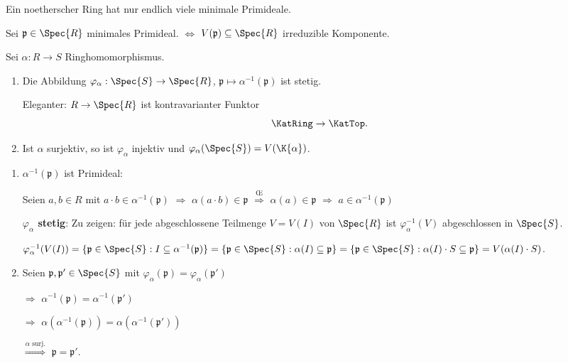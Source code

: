 \begin{Folg}
Ein noetherscher Ring hat nur endlich viele minimale Primideale.

\begin{Bew}
Sei $\mathfrak{p} \in \Spec{R}$ minimales Primideal. $\Leftrightarrow$ $V(\mathfrak{p}) \subseteq \Spec{R}$ irreduzible Komponente.
\end{Bew}
\end{Folg}

\begin{Prop}
Sei $\alpha : R \rightarrow S$ Ringhomomorphismus.

\begin{enumerate}
\item Die Abbildung $\varphi_\alpha : \Spec{S} \rightarrow \Spec{R}$, $\mathfrak{p} \mapsto \alpha^{-1}(\mathfrak{p})$ ist stetig.

Eleganter: $R \rightarrow \Spec{R}$ ist kontravarianter Funktor
\[
\KatRing \to \KatTop.
\]

\item Ist $\alpha$ surjektiv, so ist $\varphi_\alpha$ injektiv und $\varphi_\alpha(\Spec{S}) = V(\K{\alpha})$.
\end{enumerate}

\begin{Bew}
\begin{enumerate}
\item $\alpha^{-1}(\mathfrak{p})$ ist Primideal:

Seien $a,b \in R$ mit $a \cdot b \in \alpha^{-1}(\mathfrak{p})$ $\Rightarrow$ $\alpha(a \cdot b) \in \mathfrak{p}$ $\overset{\text{\OE}}\Rightarrow$ $\alpha(a) \in \mathfrak{p}$ $\Rightarrow$ $a \in \alpha^{-1}(\mathfrak{p})$

\textbf{$\varphi_\alpha$ stetig}: Zu zeigen: f\"ur jede abgeschlossene Teilmenge $V = V(I)$ von $\Spec{R}$ ist $\varphi_\alpha^{-1}(V)$ abgeschlossen in $\Spec{S}$.

$\varphi_\alpha^{-1}(V(I)) = \{ \mathfrak{p} \in \Spec{S} : I \subseteq
\alpha^{-1}(\mathfrak{p}) \} = \{ \mathfrak{p} \in \Spec{S} : \alpha(I)
\subseteq \mathfrak{p} \} = \{ \mathfrak{p} \in \Spec{S} : \alpha(I) \cdot S
\subseteq \mathfrak{p} \} = V(\alpha(I) \cdot S)$.

\item
Seien $\mathfrak{p}, \mathfrak{p'} \in \Spec{S}$ mit $\varphi_\alpha(\mathfrak{p}) = \varphi_\alpha(\mathfrak{p'})$

$\Rightarrow$ $\alpha^{-1}(\mathfrak{p}) = \alpha^{-1}(\mathfrak{p'})$

$\Rightarrow$ $\alpha(\alpha^{-1}(\mathfrak{p})) = \alpha(\alpha^{-1}(\mathfrak{p'}))$

$\overset{\alpha \text{ surj.}}\Rightarrow$ $\mathfrak{p} = \mathfrak{p'}$.

\end{enumerate}
\end{Bew}
\end{Prop}
